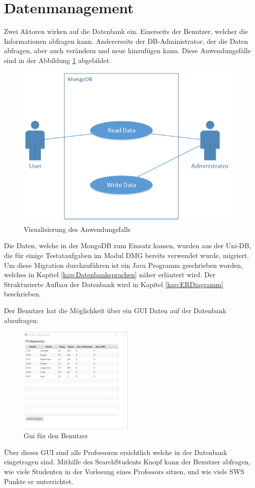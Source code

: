 \section{Datenmanagement}
Zwei Aktoren wirken auf die Datenbank ein. Einerseits der Benutzer, welcher die
Informationen abfragen kann. Andererseits der DB-Administrator, der die
Daten abfragen, aber auch verändern und neue hinzufügen kann. Diese
Anwendungsfälle sind in der Abbildung \ref{fig:usecase} abgebildet.

\begin{figure}[h]
  \centering
     \includegraphics[width=1\textwidth]{./pictures/UseCase.png}
  \caption{Visualisierung des Anwendungsfalls}
  \label{fig:usecase}
\end{figure}

Die Daten, welche in der MongoDB zum Einsatz kamen, wurden aus der Uni-DB, die für einige Testataufgaben im Modul DMG bereits verwendet wurde, migriert. Um diese Migration durchzuführen ist ein Java Programm geschrieben worden, welches in Kapitel \ref{kap:Datenbanksprachen} näher erläutert wird. Der Strukturierte Aufbau der Datenbank wird in Kapitel \ref{kap:ERDiagramm} beschrieben.

\newpage
\noindent
Der Benutzer hat die Möglichkeit über ein GUI Daten auf der Datenbank abzufragen:
\begin{figure}[h]
	\centering
	\includegraphics[width=0.5\textwidth]{./pictures/UniDBView.png}
	\caption{Gui für den Benutzer}
	\label{fig:GUI1}
\end{figure}

Über dieses GUI sind alle Professoren ersichtlich welche in der Datenbank eingetragen sind.
Mithilfe des SearchStudents Knopf kann der Benutzer abfragen, wie viele Studenten in der Vorlesung eines Professors sitzen, und wie viele SWS Punkte er unterrichtet.
